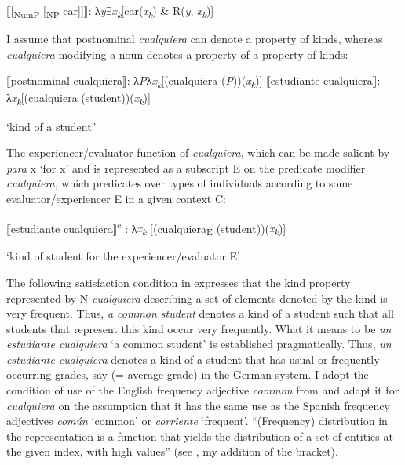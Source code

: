 {\ea \label{bkm:Ref42889808} %
⟦[\textsubscript{NumP} [\textsubscript{NP} car]]⟧: λ\textit{y}${\exists}$\textit{x\textsubscript{k}}[car(\textit{x\textsubscript{k}}) \& R(\textit{y}, \textit{x\textsubscript{k}})]
\z 

I assume that postnominal \textit{cualquiera} can denote a property of kinds, whereas \textit{cualquiera} modifying a noun denotes a property of a property of kinds:

\ea \label{ex:key:155} %
\ea  ⟦postnominal cualquiera⟧: λ\textit{P}λ\textit{x\textsubscript{k}}[(cualquiera (\textit{P}))(\textit{x\textsubscript{k}})]
\ex ⟦estudiante cualquiera⟧: λ\textit{x\textsubscript{k}}[(cualquiera (student))(\textit{x\textsubscript{k}})]

    \glt ‘kind of a student.’
\z
\z

The experiencer/evaluator function of \textit{cualquiera}, which can be made salient by \textit{para} x ‘for x’ and is represented as a subscript E on the predicate modifier \textit{cualquiera}, which predicates over types of individuals according to some evaluator/experiencer E in a given context C:

\ea \label{ex:key:156} %
  ⟦estudiante cualquiera⟧\textsuperscript{c} : λ\textit{x\textsubscript{k} }[(cualquiera\textsubscript{E} (student))(\textit{x\textsubscript{k}})]

\glt ‘kind of student for the experiencer/evaluator E’
\z

The following satisfaction condition in  expresses that the kind property represented by N \textit{cualquiera} describing a set of elements denoted by the kind is very frequent. Thus, \textit{a common student} denotes a kind of a student such that all students that represent this kind occur very frequently. What it means to be \textit{un estudiante cualquiera} ‘a common student’ is established pragmatically. Thus, \textit{un estudiante cualquiera} denotes a kind of a student that has usual or frequently occurring grades, say  (= average grade) in the German system. I adopt the condition of use of the English frequency adjective \textit{common} from \citet{GehrkeMcNally2015} and adapt it for \textit{cualquiera} on the assumption that it has the same use as the Spanish frequency adjectives \textit{común} ‘common’ or \textit{corriente} ‘frequent’. “(Frequency) distribution in the representation is a function that yields the distribution of a set of entities at the given index, with high values” (see \citealt{GehrkeMcNally2015}, my addition of the bracket).

}
